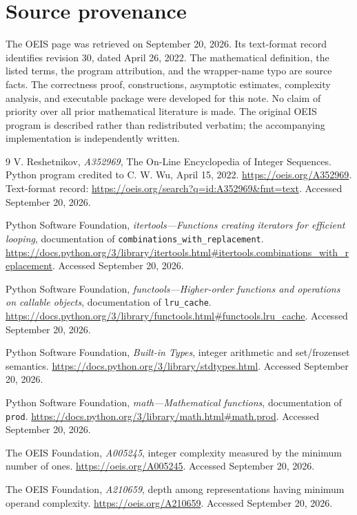 \documentclass[11pt,a4paper]{article}
\theoremstyle{definition}
\theoremstyle{remark}
\begin{document}
\section{Source provenance}
The OEIS page was retrieved on September 20, 2026. Its text-format record
identifies revision 30, dated April 26, 2022. The mathematical definition,
the listed terms, the program attribution, and the wrapper-name typo are
source facts. The correctness proof, constructions, asymptotic estimates,
complexity analysis, and executable package were developed for this note.
No claim of priority over all prior mathematical literature is made.
The original OEIS program is described rather than redistributed verbatim;
the accompanying implementation is independently written.

\begin{thebibliography}{9}
V. Reshetnikov, \emph{A352969}, The On-Line Encyclopedia of Integer
Sequences. Python program credited to C. W. Wu, April 15, 2022.
\url{https://oeis.org/A352969}.
Text-format record: \url{https://oeis.org/search?q=id:A352969&fmt=text}.
Accessed September 20, 2026.

Python Software Foundation, \emph{itertools---Functions creating iterators
for efficient looping}, documentation of
\texttt{combinations\_with\_replacement}.
\url{https://docs.python.org/3/library/itertools.html#itertools.combinations_with_replacement}.
Accessed September 20, 2026.

Python Software Foundation, \emph{functools---Higher-order functions and
operations on callable objects}, documentation of \texttt{lru\_cache}.
\url{https://docs.python.org/3/library/functools.html#functools.lru_cache}.
Accessed September 20, 2026.

Python Software Foundation, \emph{Built-in Types}, integer arithmetic and
set/frozenset semantics.
\url{https://docs.python.org/3/library/stdtypes.html}.
Accessed September 20, 2026.

Python Software Foundation, \emph{math---Mathematical functions},
documentation of \texttt{prod}.
\url{https://docs.python.org/3/library/math.html#math.prod}.
Accessed September 20, 2026.

The OEIS Foundation, \emph{A005245}, integer complexity measured by the
minimum number of ones.
\url{https://oeis.org/A005245}.
Accessed September 20, 2026.

The OEIS Foundation, \emph{A210659}, depth among representations having
minimum operand complexity.
\url{https://oeis.org/A210659}.
Accessed September 20, 2026.
\end{thebibliography}
\end{document}
